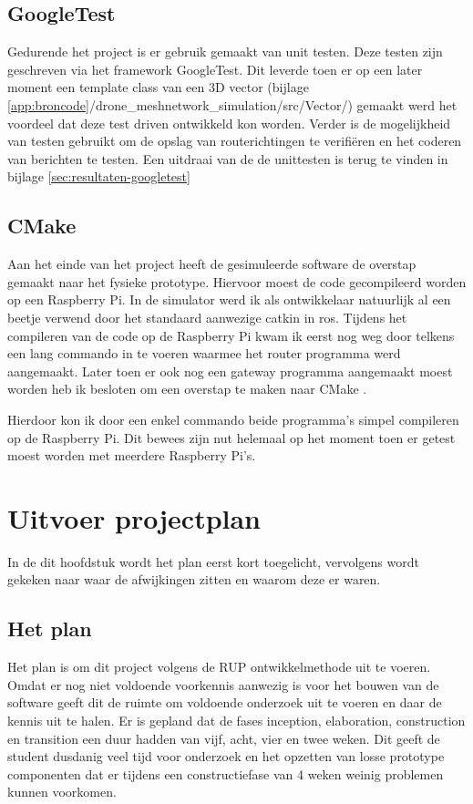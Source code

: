 \documentclass[a4paper, 11pt, oneside]{report}
\begin{document}
\section{GoogleTest}

Gedurende het project is er gebruik gemaakt van unit testen. 
Deze testen zijn geschreven via het framework GoogleTest.
Dit leverde toen er op een later moment een template class van een 3D vector (bijlage \ref{app:broncode}/drone\_meshnetwork\_simulation/src/Vector/) gemaakt werd het voordeel dat deze test driven ontwikkeld kon worden.  
Verder is de mogelijkheid van testen gebruikt om de opslag van routerichtingen te verifiëren en het coderen van berichten te testen.
Een uitdraai van de de unittesten is terug te vinden in bijlage \ref{sec:resultaten-googletest}

\section{CMake}
Aan het einde van het project heeft de gesimuleerde software de overstap gemaakt naar het fysieke prototype. 
Hiervoor moest de code gecompileerd worden op een Raspberry Pi.
In de simulator werd ik als ontwikkelaar natuurlijk al een beetje verwend door het standaard aanwezige catkin  in ros.
Tijdens het compileren van de code op de Raspberry Pi kwam ik eerst nog weg door telkens een lang commando in te voeren waarmee het router programma werd aangemaakt.
Later toen er ook nog een gateway programma aangemaakt moest worden heb ik besloten om een overstap te maken naar CMake \cite{cmake}.

Hierdoor kon ik door een enkel commando beide programma's simpel compileren op de Raspberry Pi.
Dit bewees zijn nut helemaal op het moment toen er getest moest worden met meerdere Raspberry Pi's.

\chapter{Uitvoer projectplan}\label{sec:uitvoer-projectplan}
In de dit hoofdstuk wordt het plan eerst kort toegelicht, vervolgens wordt gekeken naar waar de afwijkingen zitten en waarom deze er waren.



\section{Het plan}\label{sec:het-plan}
Het plan is om dit project volgens de RUP ontwikkelmethode uit te voeren. 
Omdat er nog niet voldoende voorkennis aanwezig is voor het bouwen van de software geeft dit de ruimte om voldoende onderzoek uit te voeren en daar de kennis uit te halen. 
Er is gepland dat de fases inception, elaboration, construction en transition een duur hadden van vijf, acht, vier en twee weken. Dit geeft de student dusdanig veel tijd voor onderzoek en het opzetten van losse prototype componenten dat er tijdens een constructiefase van 4 weken weinig problemen kunnen voorkomen. 
\end{document}
